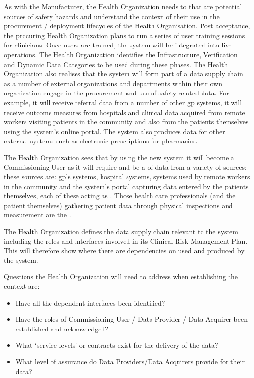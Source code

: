 As with the Manufacturer, the Health Organization needs to  that are potential sources of safety hazards and understand the context of their use in the procurement / deployment lifecycles of the Health Organisation.
Post acceptance, the procuring Health Organization plans to run a series of user training sessions for clinicians.
Once users are trained, the system will be integrated into live operations.
The Health Organization identifies the Infrastructure,
Verification and Dynamic Data Categories to be used
during these phases.
The Health Organization also realises that the system will form part of a data supply chain as a number of external organizations and departments within their own organization engage in the procurement and use of safety-related data.
For example, it will receive referral data from a number of other \gls{gp} systems, it will receive outcome measures from hospitals and clinical data acquired from remote workers visiting patients in the community and also from the patients themselves using the system's online portal.
The system also produces data for other external systems such as electronic prescriptions for pharmacies.

The Health Organization sees that by using the new system it will become a Commissioning User as it will require and be a  of data from a variety of sources; these sources are: \gls{gp}'s systems, hospital systems, systems used by remote workers in the community and the system's portal capturing data entered by the patients themselves, each of these acting as . Those health care professionals (and the patient themselves) gathering patient data through physical inspections and measurement are the .

The Health Organization defines the data supply chain relevant to the system including the roles and interfaces involved in its Clinical Risk Management Plan. This will therefore show where there are dependencies on  used and produced by the system.

Questions the Health Organization will need to address when establishing the context are:
\begin{itemize}
  \item Have all the dependent interfaces been identified?
  \item Have the roles of Commissioning User / Data Provider / Data Acquirer been established and acknowledged?
  \item What `service levels' or contracts exist for the delivery of the data?
  \item What level of assurance do Data Providers/Data Acquirers provide for their data?
\end{itemize}

